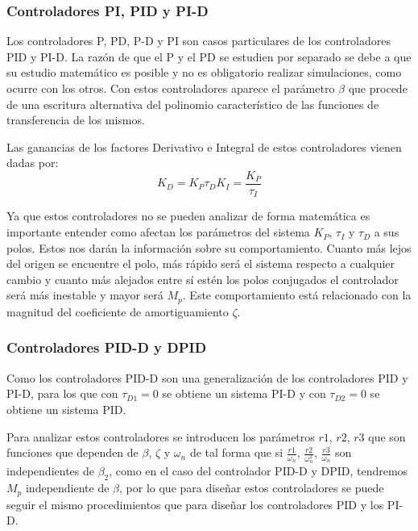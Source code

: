 \documentclass[a4paper]{article}
\begin{document}
\subsubsection{Controladores PI, PID y PI-D}
Los controladores P, PD, P-D y PI son casos particulares de los controladores PID y PI-D. La razón de que el P y el PD se estudien por separado se debe a que su estudio matemático es posible y no es obligatorio realizar simulaciones, como ocurre con los otros.
Con estos controladores aparece el parámetro $\beta$ que procede de una escritura alternativa del polinomio característico de las funciones de transferencia de los mismos.

Las ganancias de los factores Derivativo e Integral de estos controladores vienen dadas por:
\begin{subequations}
	\begin{equation}
	K_D=K_P \tau_D
	\end{equation}
	\begin{equation}
	K_I=\frac{K_P}{\tau_I}
	\end{equation}
\end{subequations}

Ya que estos controladores no se pueden analizar de forma matemática es importante entender como afectan los parámetros del sistema $K_P$, $\tau_I$ y $\tau_D$ a sus polos. Estos nos darán la información sobre su comportamiento. Cuanto más lejos del origen se encuentre el polo, más rápido será el sistema respecto a cualquier cambio y cuanto más alejados entre sí estén los polos conjugados el controlador será más inestable y mayor será $M_p$. Este comportamiento está relacionado con la magnitud del coeficiente de amortiguamiento $\zeta$.

\subsubsection{Controladores PID-D y D\textbar PID}
Como los controladores PID-D son una generalización de los controladores PID y PI-D, para los que con $\tau_{D1}=0$ se obtiene un sistema PI-D y con $\tau_{D2}=0$ se obtiene un sistema PID.

Para analizar estos controladores se introducen los parámetros $r1$, $r2$, $r3$ que son funciones que dependen de $\beta$, $\zeta$ y $\omega_n$ de tal forma que si $\frac{r1}{\omega_n}$, $\frac{r2}{\omega_n^2}$, $\frac{r3}{\omega_n}$ son independientes de $\beta_2$, como en el caso del controlador PID-D y D\textbar PID, tendremos $M_p$ independiente de $\beta$, por lo que para diseñar estos controladores se puede seguir el mismo procedimientos que para diseñar los controladores PID y los PI-D.
\end{document}
